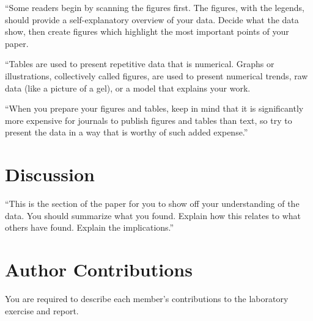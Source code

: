 \documentclass[10pt,twocolumn]{article}
\begin{document}
``Some readers begin by scanning the figures first. The figures, with the legends, should provide a self-explanatory overview of your data. Decide what the data show, then create figures which highlight the most important points of your paper.

``Tables are used to present repetitive data that is numerical. Graphs or illustrations, collectively called figures, are used to present numerical trends, raw data (like a picture of a gel), or a model that explains your work.

``When you prepare your figures and tables, keep in mind that it is significantly more expensive for journals to publish figures and tables than text, so try to present the data in a way that is worthy of such added expense.''

\section{Discussion}

``This is the section of the paper for you to show off your understanding of the data. You should summarize what you found. Explain how this relates to what others have found. Explain the implications.''

\section{Author Contributions}

You are required to describe each member's contributions to the laboratory exercise and report.
\end{document}
